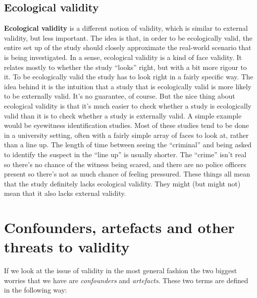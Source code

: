\documentclass[
  a4paper,
]{book}
\begin{document}
\subsection{Ecological validity}\label{ecological-validity}

\textbf{Ecological validity} is a different notion of validity, which is
similar to external validity, but less important. The idea is that, in
order to be ecologically valid, the entire set up of the study should
closely approximate the real-world scenario that is being investigated.
In a sense, ecological validity is a kind of face validity. It relates
mostly to whether the study ``looks'' right, but with a bit more rigour
to it. To be ecologically valid the study has to look right in a fairly
specific way. The idea behind it is the intuition that a study that is
ecologically valid is more likely to be externally valid. It's no
guarantee, of course. But the nice thing about ecological validity is
that it's much easier to check whether a study is ecologically valid
than it is to check whether a study is externally valid. A simple
example would be eyewitness identification studies. Most of these
studies tend to be done in a university setting, often with a fairly
simple array of faces to look at, rather than a line up. The length of
time between seeing the ``criminal'' and being asked to identify the
suspect in the ``line up'' is usually shorter. The ``crime'' isn't real
so there's no chance of the witness being scared, and there are no
police officers present so there's not as much chance of feeling
pressured. These things all mean that the study definitely lacks
ecological validity. They might (but might not) mean that it also lacks
external validity.

\section{Confounders, artefacts and other threats to
validity}\label{confounders-artefacts-and-other-threats-to-validity}

If we look at the issue of validity in the most general fashion the two
biggest worries that we have are \emph{confounders} and
\emph{artefacts}. These two terms are defined in the following way:
\end{document}
